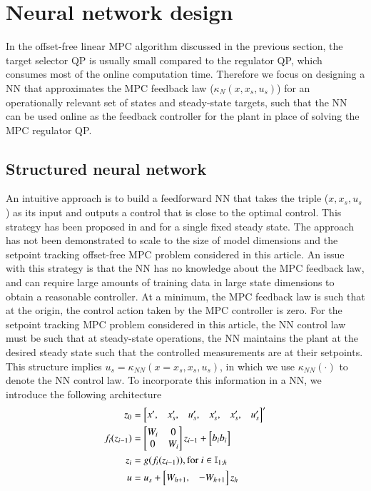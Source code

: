 \documentclass[preprint,5p, twocolumn, authoryear]{elsarticle}
\begin{document}
\section{Neural network design} \label{sec:controller_design}

In the offset-free linear MPC algorithm discussed in the previous 
section, the target selector QP is
usually small compared to the 
regulator QP, which consumes most of the online computation time. 
Therefore we focus on designing a NN that approximates the 
MPC feedback law ($\kappa_N(x, x_s, u_s)$)
for an operationally relevant set of states and steady-state targets, 
such that the NN 
can be used online as the feedback controller 
for the plant in place of solving the MPC regulator QP.

\subsection{Structured neural network}
An intuitive approach is to build a feedforward NN 
that takes the triple ($x, x_s, u_s$) as its input 
and outputs a control that is close to the optimal control. 
This strategy has been proposed in \cite*{karg:lucia:2020} and 
\cite*{chen:saulnier:atanasov:lee:kumar:pappas:morari:2018}
for a single fixed steady state. The approach has not been 
demonstrated to scale to the size of model dimensions 
and the setpoint tracking 
offset-free MPC problem considered in this article.
An issue with this strategy 
is that the NN has no knowledge about 
the MPC feedback law, and can require large amounts
of training data in large state dimensions 
to obtain a reasonable controller. At a minimum,
the MPC feedback law is such that at the origin, the 
control action taken by the MPC controller is zero. For the 
setpoint tracking MPC problem considered in this article, 
the NN control law must be such that at steady-state 
operations, the NN maintains the plant at the desired steady state
such that the controlled measurements are at their setpoints.
This structure implies $u_s = \kappa_{NN}(x = x_s, x_s, u_s)$, 
in which we use $\kappa_{NN}(\cdot)$ to denote the NN control law.
To incorporate this information in a NN, we introduce the following
architecture
\begin{align}
z_0 &= \begin{bmatrix}
    x', & x_s', & u_s', & x_s', & x_s', & u_s' \end{bmatrix}'\notag \\
    f_i(z_{i-1}) &= \begin{bmatrix}
        W_i & 0 \notag \\
        0 & W_i
          \end{bmatrix}z_{i-1}  + \begin{bmatrix}
            b_i \notag 
            b_i
            \end{bmatrix} \notag\\
    z_i &= g(f_i(z_{i-1})), \textnormal{for} \ i \in \mathbb{I}_{1:h} \notag \\
    u &= u_s + \begin{bmatrix}
  W_{h + 1}, & -W_{h + 1} \\
    \end{bmatrix} z_h
\label{eq:NNstruct}
\end{align}
\end{document}

